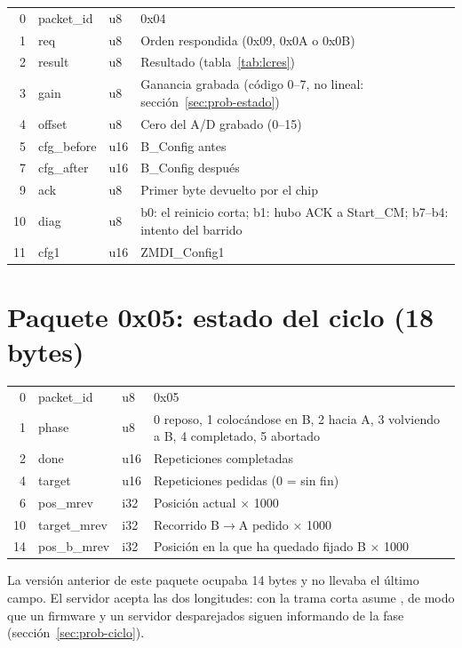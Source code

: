 \noindent\begin{tabularx}{\textwidth}{@{}rllX@{}}
\toprule
0 & packet\_id & u8 & 0x04 \\
1 & req & u8 & Orden respondida (0x09, 0x0A o 0x0B) \\
2 & result & u8 & Resultado (tabla~\ref{tab:lcres}) \\
3 & gain & u8 & Ganancia grabada (código 0--7, no lineal: sección~\ref{sec:prob-estado}) \\
4 & offset & u8 & Cero del A/D grabado (0--15) \\
5 & cfg\_before & u16 & B\_Config antes \\
7 & cfg\_after & u16 & B\_Config después \\
9 & ack & u8 & Primer byte devuelto por el chip \\
10 & diag & u8 & b0: el reinicio corta; b1: hubo ACK a Start\_CM; b7--b4: intento del barrido \\
11 & cfg1 & u16 & ZMDI\_Config1 \\
\bottomrule
\end{tabularx}

\section{Paquete 0x05: estado del ciclo (18 bytes)}

\noindent\begin{tabularx}{\textwidth}{@{}rllX@{}}
\toprule
0 & packet\_id & u8 & 0x05 \\
1 & phase & u8 & 0 reposo, 1 colocándose en B, 2 hacia A, 3 volviendo a B, 4 completado, 5 abortado \\
2 & done & u16 & Repeticiones completadas \\
4 & target & u16 & Repeticiones pedidas (0 = sin fin) \\
6 & pos\_mrev & i32 & Posición actual × 1000 \\
10 & target\_mrev & i32 & Recorrido B$\rightarrow$A pedido × 1000 \\
14 & pos\_b\_mrev & i32 & Posición en la que ha quedado fijado B × 1000 \\
\bottomrule
\end{tabularx}

\medskip
\noindent La versión anterior de este paquete ocupaba 14 bytes y no llevaba el último campo. El
servidor acepta las dos longitudes: con la trama corta asume , de modo que
un firmware y un servidor desparejados siguen informando de la fase
(sección~\ref{sec:prob-ciclo}).


